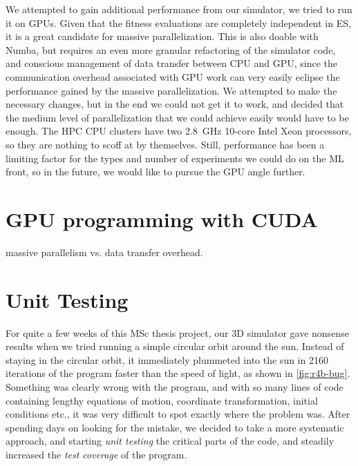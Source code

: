 We attempted to gain additional performance from our simulator, we tried to run it on GPUs. Given that the fitness evaluations are completely independent in ES, it is a great candidate for massive parallelization. This is also doable with Numba, but requires an even more granular refactoring of the simulator code, and conscious management of data transfer between CPU and GPU, since the communication overhead associated with GPU work can very easily eclipse the performance gained by the massive parallelization. We attempted to make the necessary changes, but in the end we could not get it to work, and decided that the medium level of parallelization that we could achieve easily would have to be enough. The HPC CPU clusters have two \SI{2.8}{\GHz} 10-core Intel Xeon processors, so they are nothing to scoff at by themselves. Still, performance has been a limiting factor for the types and number of experiments we could do on the ML front, so in the future, we would like to pursue the GPU angle further.

\section{GPU programming with CUDA}
massive parallelism vs. data transfer overhead.

\section{Unit Testing}
For quite a few weeks of this MSc thesis project, our 3D simulator gave nonsense results when we tried running a simple circular orbit around the sun. Instead of staying in the circular orbit, it immediately plummeted into the sun in 2160 iterations of the program faster than the speed of light, as shown in \cref{fig:r4b-bug}. Something was clearly wrong with the program, and with so many lines of code containing lengthy equations of motion, coordinate transformation, initial conditions etc., it was very difficult to spot exactly where the problem was. After spending days on looking for the mistake, we decided to take a more systematic approach, and starting \emph{unit testing} the critical parts of the code, and steadily increased the \emph{test coverage} of the program.


